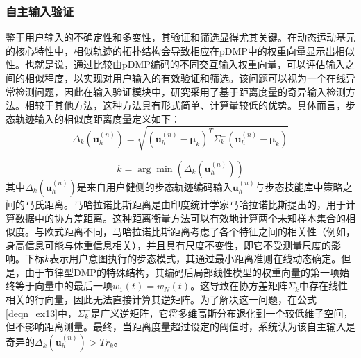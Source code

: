 \subsubsection{自主输入验证}鉴于用户输入的不确定性和多变性，其验证和筛选显得尤其关键。在动态运动基元的核心特性中，相似轨迹的拓扑结构会导致相应在pDMP中的权重向量显示出相似性。也就是说，通过比较由pDMP编码的不同交互输入权重向量，可以评估输入之间的相似程度，以实现对用户输入的有效验证和筛选\cite{ijspeertDynamicalMovementPrimitives2013}。该问题可以视为一个在线异常检测问题，因此在输入验证模块中，研究采用了基于距离度量的奇异输入检测方法。相较于其他方法，这种方法具有形式简单、计算量较低的优势。具体而言，步态轨迹输入的相似度距离度量定义如下：
\begin{equation}
  \label{deqn_ex13}
  {\Delta _k}({\pmb{u}}_h^{(n)}) = \sqrt {{{({\pmb{u}}_h^{(n)} - {{\pmb{\mu }}_k})}^T}\Sigma _k^ - ({\pmb{u}}_h^{(n)} - {{\pmb{\mu }}_k})} 
\end{equation}   

\begin{equation}
  \label{deqn_ex14}
  k = \arg \min \left( {{\Delta _k}({\pmb{u}}_h^{(n)})} \right)
\end{equation}
其中${\Delta _k}(\pmb{u}_h^{(n)})$是来自用户健侧的步态轨迹编码输入${\pmb{u}}_h^{(n)}$与步态技能库中策略之间的马氏距离。马哈拉诺比斯距离是由印度统计学家马哈拉诺比斯提出的，用于计算数据中的协方差距离。这种距离衡量方法可以有效地计算两个未知样本集合的相似度。与欧式距离不同，马哈拉诺比斯距离考虑了各个特征之间的相关性（例如，身高信息可能与体重信息相关），并且具有尺度不变性，即它不受测量尺度的影响。下标$k$表示用户意图执行的步态模式，其通过最小距离准则在线动态确定。但是，由于节律型DMP的特殊结构，其编码后局部线性模型的权重向量的第一项始终等于向量中的最后一项${w_1}(t)={w_N}(t)$。这导致在协方差矩阵${\Sigma _k}$中存在线性相关的行向量，因此无法直接计算其逆矩阵。为了解决这一问题，在公式\ref{deqn_ex13}中，$\Sigma_k^-$是广义逆矩阵，它将多维高斯分布退化到一个较低维子空间，但不影响距离测量。最终，当距离度量超过设定的阈值时，系统认为该自主输入是奇异的${\Delta _k}(\pmb{u}_h^{(n)}) > T{r_k}$。  

